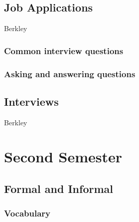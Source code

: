 \documentclass{scrreprt}
\begin{document}





\section{Job Applications}
Berkley%
\subsection{Common interview questions}
\subsection{Asking and answering questions}


\section{Interviews}
Berkley%

\chapter{Second Semester}

\section{Formal and Informal}
\subsection{Vocabulary}
\end{document}
